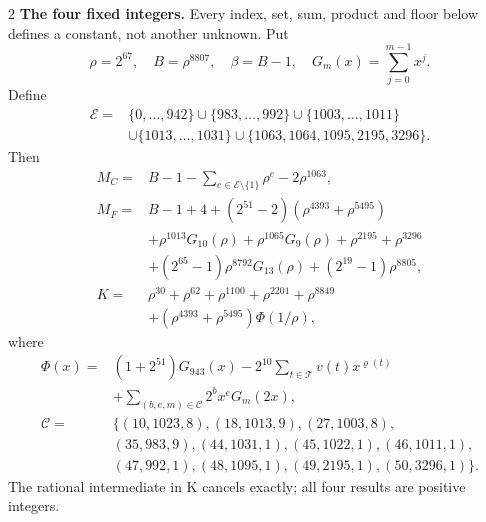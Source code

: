 \documentclass[10pt]{article}
\newcommand{\rg}[2]{\{#1,\ldots,#2\}}
\begin{document}
\begin{multicols}{2}
\textbf{The four fixed integers.}
Every index, set, sum, product and floor below defines a constant, not
another unknown. Put
\[
\rho=2^{67},\quad B=\rho^{8807},\quad\beta=B-1,\quad
G_m(x)=\sum_{j=0}^{m-1}x^j.
\]
Define
\[
\begin{split}
\mathcal E={}&\rg0{942}\cup\rg{983}{992}\cup\rg{1003}{1011}\\
&\cup\rg{1013}{1031}\cup\{1063,1064,1095,2195,3296\}.
\end{split}
\]
Then
\begin{align*}
M_C={}&B-1-\sum_{e\in\mathcal E\setminus\{1\}}\rho^e-2\rho^{1063},\\
M_F={}&B-1+4+(2^{51}-2)(\rho^{4393}+\rho^{5495})\\
&+\rho^{1013}G_{10}(\rho)+\rho^{1065}G_9(\rho)
  +\rho^{2195}+\rho^{3296}\\
&+(2^{65}-1)\rho^{8792}G_{13}(\rho)+(2^{19}-1)\rho^{8805},\\
K={}&\rho^{30}+\rho^{62}+\rho^{1100}+\rho^{2201}+\rho^{8849}\\
&+(\rho^{4393}+\rho^{5495})\Phi(1/\rho),
\end{align*}
where
\[
\begin{split}
\Phi(x)={}&(1+2^{51})G_{943}(x)
 -2^{10}\sum_{t\in\mathcal T}v(t)x^{\varrho(t)}\\
&+\sum_{(b,e,m)\in\mathcal C}2^b x^e G_m(2x),\\
\mathcal C={}&\{(10,1023,8),(18,1013,9),(27,1003,8),\\
&(35,983,9),(44,1031,1),(45,1022,1),(46,1011,1),\\
&(47,992,1),(48,1095,1),(49,2195,1),(50,3296,1)\}.
\end{split}
\]
The rational intermediate in K cancels exactly; all four results are positive integers.


\end{multicols}
\end{document}
